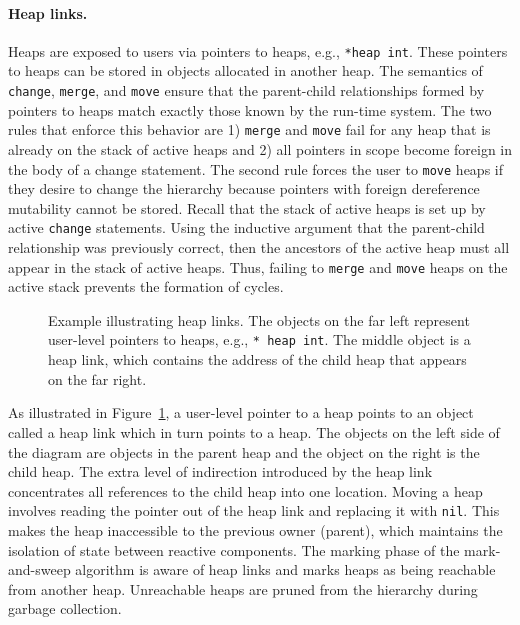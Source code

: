 \paragraph{Heap links.}
Heaps are exposed to users via pointers to heaps, e.g., \verb+*heap int+.
These pointers to heaps can be stored in objects allocated in another heap.
The semantics of \verb+change+, \verb+merge+, and \verb+move+ ensure that the parent-child relationships formed by pointers to heaps match exactly those known by the run-time system.
The two rules that enforce this behavior are 1) \verb+merge+ and \verb+move+ fail for any heap that is already on the stack of active heaps and 2) all pointers in scope become foreign in the body of a change statement.
The second rule forces the user to \verb+move+ heaps if they desire to change the hierarchy because pointers with foreign dereference mutability cannot be stored.
Recall that the stack of active heaps is set up by active \verb+change+ statements.
Using the inductive argument that the parent-child relationship was previously correct, then the ancestors of the active heap must all appear in the stack of active heaps.
Thus, failing to \verb+merge+ and \verb+move+ heaps on the active stack prevents the formation of cycles.

\begin{figure}
\centering
\begingroup
\fontsize{10pt}{12pt}\selectfont
{}
\endgroup
\cprotect\caption{Example illustrating heap links.  The objects on the far left represent user-level pointers to heaps, e.g., \verb+* heap int+.  The middle object is a heap link, which contains the address of the child heap that appears on the far right.}
\label{heap_link}
\end{figure}

As illustrated in Figure~\ref{heap_link}, a user-level pointer to a heap points to an object called a heap link which in turn points to a heap.
The objects on the left side of the diagram are objects in the parent heap and the object on the right is the child heap.
The extra level of indirection introduced by the heap link concentrates all references to the child heap into one location.
Moving a heap involves reading the pointer out of the heap link and replacing it with \verb+nil+.
This makes the heap inaccessible to the previous owner (parent), which maintains the isolation of state between reactive components.
The marking phase of the mark-and-sweep algorithm is aware of heap links and marks heaps as being reachable from another heap.
Unreachable heaps are pruned from the hierarchy during garbage collection.

